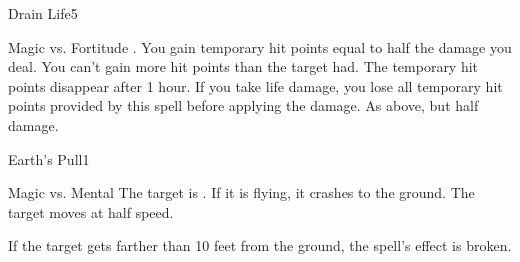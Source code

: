 \begin{spellsection}{Drain Life}{5}
    \begin{spellheader}
    \end{spellheader}
    \begin{spellcontent}
        \begin{spelltargetinginfo}
        \end{spelltargetinginfo}
        \begin{spelleffects}
            \begin{spellattack}{Magic vs. Fortitude}
                \spellsuccess {}. You gain temporary hit points equal to half the damage you deal. You can't gain more hit points than the target had. The temporary hit points disappear after 1 hour. If you take life damage, you lose all temporary hit points provided by this spell before applying the damage.
                \spellfailure As above, but half damage.
            \end{spellattack}
            \spelldur \durlong
        \end{spelleffects}
    \end{spellcontent}
    \begin{spellfooter}
        \miscastrandom
    \end{spellfooter}
\end{spellsection}


\begin{spellsection}{Earth's Pull}{1}
    \begin{spellheader}
    \end{spellheader}
    \begin{spellcontent}
        \begin{spelltargetinginfo}
            \spellrng{\rngclose}
        \end{spelltargetinginfo}
        \begin{spelleffects}
            \begin{spellattack}{Magic vs. Mental}
                \spellsuccess The target is \immobilized. If it is flying, it crashes to the ground.
                \spellfailure The target moves at half speed.
            \end{spellattack}
            \spelldur \durshort
        \end{spelleffects}
    \end{spellcontent}
    \begin{spellfooter}
        \spellnotes If the target gets farther than 10 feet from the ground, the spell's effect is broken.
        \miscastrandom
    \end{spellfooter}
\end{spellsection}

